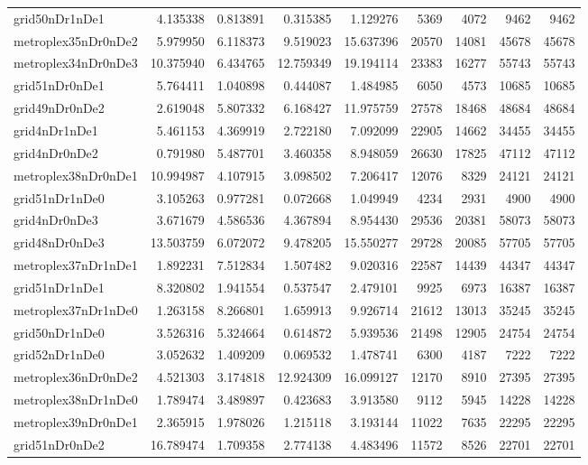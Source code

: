 \begin{longtable}{|l|r|r|r|r|r|r|r|r|}
grid50nDr1nDe1 & 4.135338 & 0.813891 & 0.315385 & 1.129276 & 5369 & 4072 & 9462 & 9462 \\
metroplex35nDr0nDe2 & 5.979950 & 6.118373 & 9.519023 & 15.637396 & 20570 & 14081 & 45678 & 45678 \\
metroplex34nDr0nDe3 & 10.375940 & 6.434765 & 12.759349 & 19.194114 & 23383 & 16277 & 55743 & 55743 \\
grid51nDr0nDe1 & 5.764411 & 1.040898 & 0.444087 & 1.484985 & 6050 & 4573 & 10685 & 10685 \\
grid49nDr0nDe2 & 2.619048 & 5.807332 & 6.168427 & 11.975759 & 27578 & 18468 & 48684 & 48684 \\
grid4nDr1nDe1 & 5.461153 & 4.369919 & 2.722180 & 7.092099 & 22905 & 14662 & 34455 & 34455 \\
grid4nDr0nDe2 & 0.791980 & 5.487701 & 3.460358 & 8.948059 & 26630 & 17825 & 47112 & 47112 \\
metroplex38nDr0nDe1 & 10.994987 & 4.107915 & 3.098502 & 7.206417 & 12076 & 8329 & 24121 & 24121 \\
grid51nDr1nDe0 & 3.105263 & 0.977281 & 0.072668 & 1.049949 & 4234 & 2931 & 4900 & 4900 \\
grid4nDr0nDe3 & 3.671679 & 4.586536 & 4.367894 & 8.954430 & 29536 & 20381 & 58073 & 58073 \\
grid48nDr0nDe3 & 13.503759 & 6.072072 & 9.478205 & 15.550277 & 29728 & 20085 & 57705 & 57705 \\
metroplex37nDr1nDe1 & 1.892231 & 7.512834 & 1.507482 & 9.020316 & 22587 & 14439 & 44347 & 44347 \\
grid51nDr1nDe1 & 8.320802 & 1.941554 & 0.537547 & 2.479101 & 9925 & 6973 & 16387 & 16387 \\
metroplex37nDr1nDe0 & 1.263158 & 8.266801 & 1.659913 & 9.926714 & 21612 & 13013 & 35245 & 35245 \\
grid50nDr1nDe0 & 3.526316 & 5.324664 & 0.614872 & 5.939536 & 21498 & 12905 & 24754 & 24754 \\
grid52nDr1nDe0 & 3.052632 & 1.409209 & 0.069532 & 1.478741 & 6300 & 4187 & 7222 & 7222 \\
metroplex36nDr0nDe2 & 4.521303 & 3.174818 & 12.924309 & 16.099127 & 12170 & 8910 & 27395 & 27395 \\
metroplex38nDr1nDe0 & 1.789474 & 3.489897 & 0.423683 & 3.913580 & 9112 & 5945 & 14228 & 14228 \\
metroplex39nDr0nDe1 & 2.365915 & 1.978026 & 1.215118 & 3.193144 & 11022 & 7635 & 22295 & 22295 \\
grid51nDr0nDe2 & 16.789474 & 1.709358 & 2.774138 & 4.483496 & 11572 & 8526 & 22701 & 22701 \\

\end{longtable}
